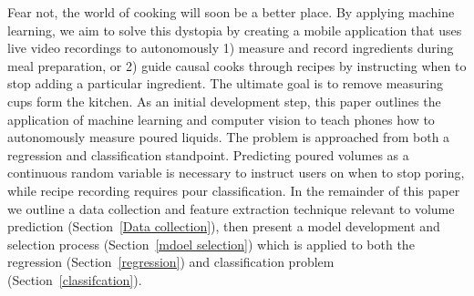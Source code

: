 \documentclass[twocolumn,10pt]{article}
\begin{document}
Fear not, the world of cooking will soon be a better place. By applying machine learning, we aim to solve this dystopia by creating a mobile application that uses live video recordings to autonomously 1) measure and record ingredients during meal preparation, or 2) guide causal cooks through recipes by instructing when to stop adding a particular ingredient. The ultimate goal is to remove measuring cups form the kitchen. As an initial development step, this paper outlines the application of machine learning and computer vision to teach phones how to  autonomously measure poured liquids. The problem is approached from both a regression and classification standpoint. Predicting poured volumes as a continuous random variable is necessary to instruct users on when to stop poring, while recipe recording requires pour classification. In the remainder of this paper we outline a data collection and feature extraction technique relevant to volume prediction (Section~\ref{Data collection}), then present a model development and selection process (Section~\ref{mdoel selection}) which is applied to both the regression (Section~\ref{regression}) and classification problem (Section~\ref{classifcation}).  
\end{document}
